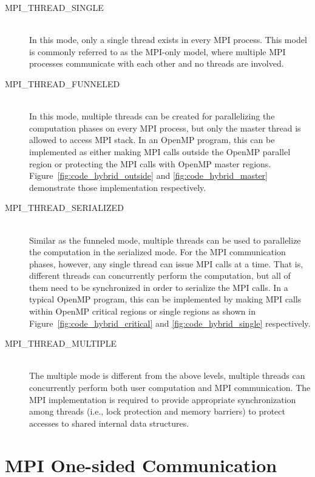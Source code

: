 \begin{description}
\item[MPI\_THREAD\_SINGLE] \hfill \\
In this mode, only a single thread exists in every MPI process. This
model is commonly referred to as the MPI-only model, where multiple
MPI processes communicate with each other and no threads are involved.

\item[MPI\_THREAD\_FUNNELED] \hfill \\
In this mode, multiple threads can be created for parallelizing the
computation phases on every MPI process, but only the master thread is
allowed to access MPI stack. In an OpenMP program, this can be implemented
as either making MPI calls outside the OpenMP parallel region or protecting
the MPI calls with OpenMP master regions. Figure~\ref{fig:code_hybrid_outside}
and \ref{fig:code_hybrid_master} demonstrate those implementation
respectively.

\item[MPI\_THREAD\_SERIALIZED] \hfill \\
Similar as the funneled mode, multiple threads can be used to parallelize
the computation in the serialized mode. For the MPI communication phases,
however, any single thread can issue MPI calls at a time. That is, different
threads can concurrently perform the computation, but all of them need to
be synchronized in order to serialize the MPI calls.  In a typical OpenMP
program, this can be implemented by making MPI calls within OpenMP critical
regions or single regions as shown in Figure~\ref{fig:code_hybrid_critical}
and \ref{fig:code_hybrid_single} respectively.

\item[MPI\_THREAD\_MULTIPLE] \hfill \\
The multiple mode is different from the above levels, multiple threads
can concurrently perform both user computation and MPI communication.
The MPI implementation is required to provide appropriate synchronization
among threads (i.e., lock protection and memory barriers) to protect
accesses to shared internal data structures.

\end{description}


\section{MPI One-sided Communication}\label{sec:back-rma}

